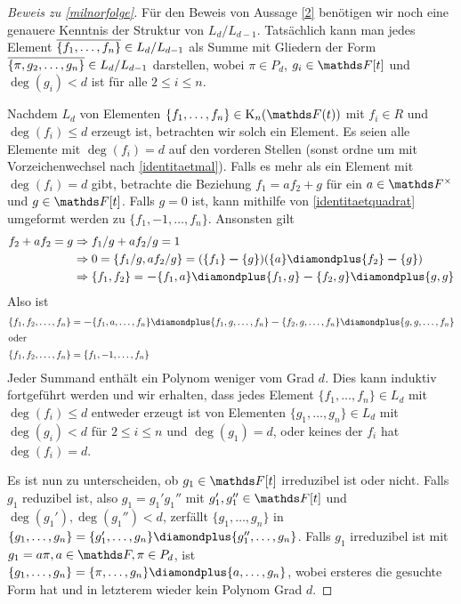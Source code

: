 \documentclass[ngerman,fontsize=11pt, paper=a4, parskip=half, titlepage=true, toc=bib]{scrartcl}
\begin{document}
\begin{proof}[Beweis zu \ref{milnorfolge}]
  Für den Beweis von Aussage \ref{2} benötigen wir noch eine genauere
  Kenntnis der Struktur von $L_d/L_{d-1}$.
  Tatsächlich kann man jedes Element 
  $\overline{\{f_1,\dotsc,f_n\}}\in L_d/L_{d-1}$ als Summe
  mit Gliedern der Form  $\overline{\{\pi,g_2,\dotsc,g_n\}}\in L_d/L_{d-1}$
  darstellen, wobei $\pi\in P_d$, $g_i\in\F[t]$ 
  und $\deg(g_i)<d$ ist für alle $2\leq i\leq n$.
  
  Nachdem $L_d$ von Elementen $\{f_1,\dotsc,f_n\}\in\KnFt$ mit
  $f_i\in R$ und $\deg(f_i)\leq d$ erzeugt ist, 
  betrachten wir solch ein Element.
  Es seien alle Elemente mit $\deg(f_i)=d$ auf den vorderen Stellen 
  (sonst ordne um mit Vorzeichenwechsel nach \ref{identitaetmal}).
  Falls es mehr als ein Element mit $\deg(f_i)=d$ gibt, betrachte
  die Beziehung $f_1=a f_2 + g$ für ein $a\in\Fx$ und $g\in\F[t]$.
  Falls $g=0$ ist, kann mithilfe von \ref{identitaetquadrat}
  umgeformt werden zu $\{f_1,-1,\dotsc,f_n\}$.
  Ansonsten gilt
  \begin{align*}
    f_2+af_2=g 
    &\Rightarrow f_1/g+af_2/g=1\\
    &\Rightarrow 0=\{f_1/g,af_2/g\}=(\{f_1\}\m\{g\})(\{a\}\p\{f_2\}\m\{g\})\\
    &\Rightarrow \{f_1,f_2\}=\m\{f_1,a\}\p\{f_1,g\}\m\{f_2,g\}\p\{g,g\}
  \end{align*}
  Also ist 
  \begin{align*}
    \{f_1,f_2,\dotsc,f_n\} 
    &=\m \{f_1,a,\dotsc,f_n\}
      \p \{f_1,g,\dotsc,f_n\}
      \m \{f_2,g,\dotsc,f_n\}
      \p \{g,g,\dotsc,f_n\}\\
    \intertext{oder}
    \{f_1,f_2,\dotsc,f_n\} 
    &=\{f_1,-1,\dotsc,f_n\}
  \end{align*}
  Jeder Summand enthält ein Polynom weniger vom Grad $d$.
  Dies kann induktiv fortgeführt werden und wir erhalten,
  dass jedes Element $\{f_1,\dotsc,f_n\}\in L_d$ mit $\deg(f_i)\leq d$
  entweder erzeugt ist von Elementen $\{g_1,\dotsc, g_n\}\in L_d$ mit
  $\deg(g_i)<d$ für $2\leq i\leq n$ und $\deg(g_1)=d$,
  oder keines der $f_i$ hat $\deg(f_i)=d$.
  
  Es ist nun zu unterscheiden, ob $g_1\in\F[t]$ irreduzibel ist oder
  nicht. Falls $g_1$ reduzibel ist, also $g_1=g_1'g_1''$ mit
  $g_1',g_1''\in\F[t]$ und $\deg(g_1'),\deg(g_1'')<d$,
  zerfällt $\{g_1,\dotsc,g_n\}$ in 
  $\{g_1,\dotsc,g_n\}=\{g_1',\dotsc,g_n\}\p\{g_1'',\dotsc,g_n\}$.
  Falls $g_1$ irreduzibel ist mit $g_1=a\pi, a\in\F, \pi\in P_d$, 
  ist $\{g_1,\dotsc,g_n\}=\{\pi,\dotsc,g_n\}\p\{a,\dotsc,g_n\}$,
  wobei ersteres die gesuchte Form hat und in letzterem wieder kein
  Polynom Grad $d$.


\end{proof}
\end{document}
